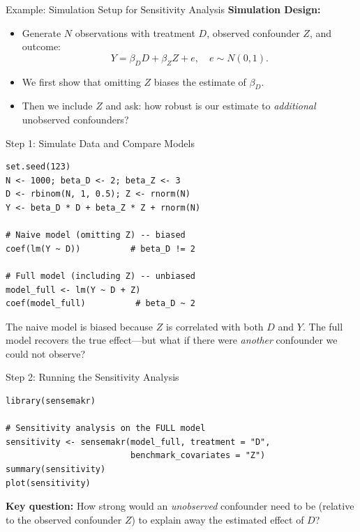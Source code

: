 \documentclass[aspectratio=169, handout, t]{beamer}
\numberwithin{equation}{section}
\begin{document}
\begin{frame}{Example: Simulation Setup for Sensitivity Analysis}
\textbf{Simulation Design:}
\begin{itemize}
    \item Generate \(N\) observations with treatment \(D\), observed confounder \(Z\), and outcome:
    \[
    Y = \beta_D D + \beta_Z Z + e,\quad e \sim N(0,1).
    \]
    \item We first show that omitting \(Z\) biases the estimate of \(\beta_D\).
    \item Then we include \(Z\) and ask: how robust is our estimate to \emph{additional} unobserved confounders?
\end{itemize}
\end{frame}

\begin{frame}[fragile]{Step 1: Simulate Data and Compare Models}
\begin{lstlisting}
set.seed(123)
N <- 1000; beta_D <- 2; beta_Z <- 3
D <- rbinom(N, 1, 0.5); Z <- rnorm(N)
Y <- beta_D * D + beta_Z * Z + rnorm(N)

# Naive model (omitting Z) -- biased
coef(lm(Y ~ D))          # beta_D != 2

# Full model (including Z) -- unbiased
model_full <- lm(Y ~ D + Z)
coef(model_full)          # beta_D ~ 2
\end{lstlisting}
\vspace{1ex}
The naive model is biased because $Z$ is correlated with both $D$ and $Y$. The full model recovers the true effect---but what if there were \emph{another} confounder we could not observe?
\end{frame}

\begin{frame}[fragile]{Step 2: Running the Sensitivity Analysis}
\begin{lstlisting}
library(sensemakr)

# Sensitivity analysis on the FULL model
sensitivity <- sensemakr(model_full, treatment = "D",
                         benchmark_covariates = "Z")
summary(sensitivity)
plot(sensitivity)
\end{lstlisting}
\vspace{1ex}
\textbf{Key question:} How strong would an \emph{unobserved} confounder need to be (relative to the observed confounder $Z$) to explain away the estimated effect of $D$?
\end{frame}
\end{document}
